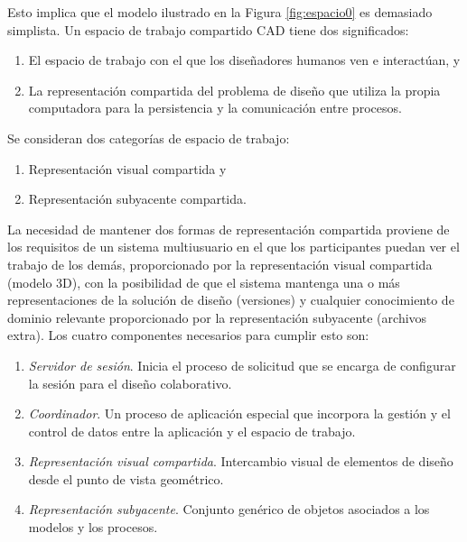 Esto implica que el modelo ilustrado en la Figura \ref{fig:espacio0} es demasiado simplista. Un espacio de trabajo compartido CAD tiene dos significados:
\begin{enumerate}
\item El espacio de trabajo con el que los diseñadores humanos ven e interactúan, y
\item La representación compartida del problema de diseño que utiliza la propia computadora para la persistencia y la comunicación entre procesos.
\end{enumerate}

Se consideran dos categorías de espacio de trabajo:

\begin{enumerate}
    \item Representación visual compartida y
    \item Representación subyacente compartida.
\end{enumerate}
La necesidad de mantener dos formas de representación compartida proviene de los requisitos de un sistema multiusuario en el que los participantes puedan ver el trabajo de los demás, proporcionado por la representación visual compartida (modelo 3D), con la posibilidad de que el sistema mantenga una o más representaciones de la solución de diseño (versiones) y cualquier conocimiento de dominio relevante proporcionado por la representación subyacente (archivos extra). Los cuatro componentes necesarios para cumplir esto son:

\begin{enumerate}
    \item \textit{Servidor de sesión}. Inicia el proceso de solicitud que se encarga de configurar la sesión para el diseño colaborativo.
    \item \textit{Coordinador}. Un proceso de aplicación especial que incorpora la gestión y el control de datos entre la aplicación y el espacio de trabajo.
    \item \textit{Representación visual compartida}. Intercambio visual de elementos de diseño desde el punto de vista geométrico.
    \item \textit{Representación subyacente}. Conjunto genérico de objetos asociados a los modelos y los procesos.
\end{enumerate}

